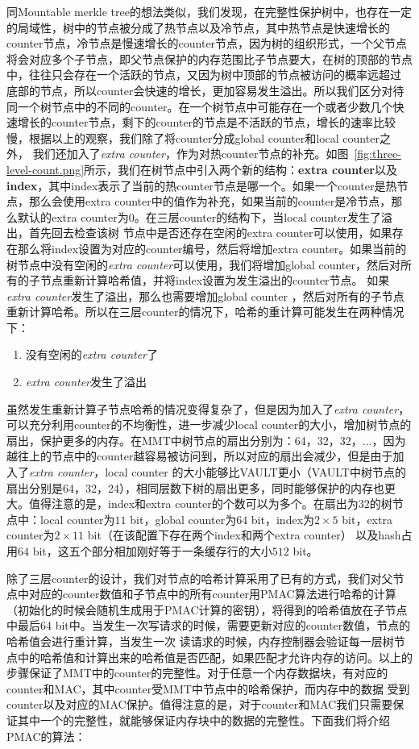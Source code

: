 同Mountable merkle tree的想法类似，我们发现，在完整性保护树中，也存在一定的局域性，树中的节点被分成了热节点以及冷节点，其中热节点是快速增长的counter节点，冷节点是慢速增长的counter节点，因为树的组织形式，一个父节点将会对应多个子节点，即父节点保护的内存范围比子节点要大，在树的顶部的节点中，往往只会存在一个活跃的节点，又因为树中顶部的节点被访问的概率远超过
底部的节点，所以counter会快速的增长，更加容易发生溢出。所以我们区分对待同一个树节点中的不同的counter。在一个树节点中可能存在一个或者少数几个快速增长的counter节点，剩下的counter的节点是不活跃的节点，增长的速率比较慢，根据以上的观察，我们除了将counter分成global counter和local counter之外，
我们还加入了\emph{extra counter}，作为对热counter节点的补充。如图~\ref{fig:three-level-count.png}所示，我们在树节点中引入两个新的结构：\textbf{extra counter}以及\textbf{index}，其中index表示了当前的热counter节点是哪一个。如果一个counter是热节点，那么会使用extra counter中的值作为补充，如果当前的counter是冷节点，那么默认的extra counter为0。在三层counter的结构下，当local counter发生了溢出，首先回去检查该树
节点中是否还存在空闲的extra counter可以使用，如果存在那么将index设置为对应的counter编号，然后将增加extra counter。如果当前的树节点中没有空闲的\emph{extra counter}可以使用，我们将增加global counter，然后对所有的子节点重新计算哈希值，并将index设置为发生溢出的counter节点。
如果\emph{extra counter}发生了溢出，那么也需要增加global counter ，然后对所有的子节点重新计算哈希。所以在三层counter的情况下，哈希的重计算可能发生在两种情况下：
\begin{enumerate}
  \item 没有空闲的\emph{extra counter}了
  \item \emph{extra counter}发生了溢出
\end{enumerate}
虽然发生重新计算子节点哈希的情况变得复杂了，但是因为加入了\emph{extra counter}，可以充分利用counter的不均衡性，进一步减少local counter的大小，增加树节点的扇出，保护更多的内存。在MMT中树节点的扇出分别为：64，32，32，...，因为越往上的节点中的counter越容易被访问到，所以对应的扇出会减少，但是由于加入了\emph{extra counter}，local counter
的大小能够比VAULT更小（VAULT中树节点的扇出分别是64，32，24），相同层数下树的扇出更多，同时能够保护的内存也更大。值得注意的是，index和extra counter的个数可以为多个。在扇出为$32$的树节点中：local counter为$11$ bit，global counter为$64$ bit，index为$2\times5$ bit，extra counter为$2\times11$ bit（在该配置下存在两个index和两个extra counter）
以及hash占用$64$ bit，这五个部分相加刚好等于一条缓存行的大小$512$ bit。

除了三层counter的设计，我们对节点的哈希计算采用了已有的方式，我们对父节点中对应的counter数值和子节点中的所有counter用PMAC算法进行哈希的计算（初始化的时候会随机生成用于PMAC计算的密钥），将得到的哈希值放在子节点中最后64 bit中。当发生一次写请求的时候，需要更新对应的counter数值，节点的哈希值会进行重计算，当发生一次
读请求的时候，内存控制器会验证每一层树节点中的哈希值和计算出来的哈希值是否匹配，如果匹配才允许内存的访问。以上的步骤保证了MMT中的counter的完整性。对于任意一个内存数据块，有对应的counter和MAC，其中counter受MMT中节点中的哈希保护，而内存中的数据
受到counter以及对应的MAC保护。值得注意的是，对于counter和MAC我们只需要保证其中一个的完整性，就能够保证内存块中的数据的完整性。下面我们将介绍PMAC的算法：

